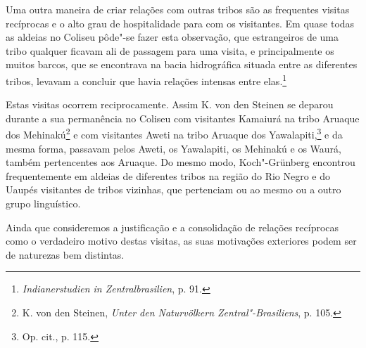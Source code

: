 Uma outra maneira de criar relações com outras tribos são as frequentes
visitas recíprocas e o alto grau de hospitalidade para com os
visitantes. Em quase todas as aldeias no Coliseu pôde"-se fazer esta
observação, que estrangeiros de uma tribo qualquer ficavam ali de
passagem para uma visita, e principalmente os muitos barcos, que se
encontrava na bacia hidrográfica situada entre as diferentes tribos,
levavam a concluir que havia relações intensas entre elas.\footnote{\emph{Indianerstudien
  in Zentralbrasilien}, p. 91.}

Estas visitas ocorrem reciprocamente. Assim K. von den Steinen se
deparou durante a sua permanência no Coliseu com visitantes Kamaiurá na
tribo Aruaque dos Mehinakú\footnote{K. von den Steinen, \emph{Unter den
  Naturvölkern Zentral"-Brasiliens}, p. 105.} e com visitantes Aweti na
tribo Aruaque dos Yawalapiti,\footnote{Op. cit., p. 115.} e da mesma
forma, passavam pelos Aweti, os Yawalapiti, os Mehinakú e os Waurá,
também pertencentes aos Aruaque. Do mesmo modo, Koch"-Grünberg encontrou
frequentemente em aldeias de diferentes tribos na região do Rio Negro e
do Uaupés visitantes de tribos vizinhas, que pertenciam ou ao mesmo ou a
outro grupo linguístico.

Ainda que consideremos a justificação e a consolidação de relações
recíprocas como o verdadeiro motivo destas visitas, as suas motivações
exteriores podem ser de naturezas bem distintas.


